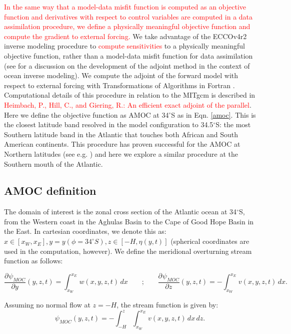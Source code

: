 \documentclass[a4paper,11pt]{article}
\newcommand{\pderiv}[3][]{%
  \ensuremath{\frac{\partial^{#1} {#2}}{\partial {#3}^{#1}}}}
\newcommand{\red}[1]{\textcolor{red}{#1}}
\begin{document}
	\red{In the same way that a model-data misfit function is computed as an objective function and derivatives with respect to control variables are computed in a data assimilation procedure, we define a physically meaningful objective function and compute the gradient to external forcing.  }
	We take advantage of the ECCOv4r2 inverse modeling procedure to \red{compute sensitivities} to a physically meaningful objective function, rather than a model-data misfit function for data assimilation (see \cite{forgetECCOv4} for a discussion on the development of the adjoint method in the context of ocean inverse modeling). We compute the adjoint of the forward model with respect to external forcing with Transformations of Algorithms in Fortran \cite{giering2005}. Computational details of this procedure in relation to the MITgcm is described in \red{Heimbach, P., Hill, C., and Giering, R.: An efficient exact adjoint of the parallel}. Here we define the objective function as AMOC at 34$^{\circ}$S as in Eqn. \ref{amoc}. This is the closest latitude band resolved in the model configuration to 34.5$^{\circ}$S: the most Southern latitude band in the Atlantic that touches both African and South American continents. This procedure has proven successful for the AMOC at Northern latitudes (see e.g. \cite{pillarAttribution} \cite{heimbachTimescales} \cite{czeschelOscillatory}) and here we explore a similar procedure at the Southern mouth of the Atlantic. 

  \subsection{AMOC definition}
  
    The domain of interest is the zonal cross section of the Atlantic ocean at 34$^{\circ}$S, from the Western coast in the Aghulas Basin to the Cape of Good Hope Basin in the East. In cartesian coordinates, we denote this as: $x \in [x_W,x_E], y = y(\phi=34^{\circ}S), z \in [-H,\eta(y,t)]$ (spherical coordinates are used in the computation, however).  We define the meridional overturning stream function as follows: 
    
    \begin{equation}
      \pderiv[]{\psi_{MOC}}{y}(y,z,t) = \int_{x_W}^{x_E}w(x,y,z,t)\,dx \qquad\text{;}\qquad \pderiv[]{\psi_{MOC}}{z}(y,z,t) = -\int_{x_W}^{x_E}v(x,y,z,t)\,dx .
     \label{eq:mocStf}
    \end{equation}

   Assuming no normal flow at $z = -H$, the stream function is given by:
   \begin{equation}
    \psi_{MOC}(y,z,t) = -\int_{-H}^{z}\int_{x_W}^{x_E}v(x,y,z,t)\,dx\,dz .
    \label{eq:mocStf2}
   \end{equation}
\end{document}
